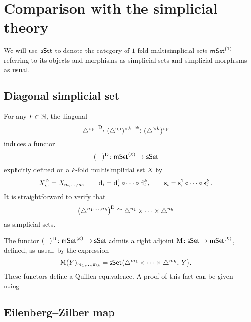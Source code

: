 
\section{Comparison with the simplicial theory}\label{s:comparison}

We will use $\mathsf{sSet}$ to denote the category of $1$-fold multisimplicial sets $\mathsf{mSet}^{(1)}$ referring to its objects and morphisms as simplicial sets and simplicial morphisms as usual.

\subsection{Diagonal simplicial set}\label{ss:diagonal}

For any $k \in \mathbb{N}$, the diagonal
\[
\triangle^{\mathrm{op}} \xrightarrow{\mathrm{D}}
(\triangle^{\mathrm{op}})^{\times k} \xrightarrow{\cong}
(\triangle^{\times k})^{\mathrm{op}}
\]
induces a functor
\[
(-)^{\mathrm{D}} \colon \mathsf{mSet}^{(k)} \to \mathsf{sSet}
\]
explicitly defined on a $k$-fold multisimplicial set $X$ by
\begin{gather*}
	X^{\mathrm{D}}_m = X_{m, \dots, m},
	\qquad
	\operatorname{d}_i = \operatorname{d}_i^1 \circ \dots \circ \operatorname{d}_i^k,
	\qquad
	\operatorname{s}_i = \operatorname{s}_i^1 \circ \dots \circ \operatorname{s}_i^k.
\end{gather*}
It is straightforward to verify that
\[
\big(\triangle^{n_1,\dots,n_k}\big)^{\mathrm{D}} \cong
\triangle^{n_1}\times\dots\times\triangle^{n_k}
\]
as simplicial sets.

The functor $(-)^{\mathrm{D}} \colon \mathsf{mSet}^{(k)} \to \mathsf{sSet}$ admits a right adjoint $\operatorname{M} \colon \mathsf{sSet} \to \mathsf{mSet}^{(k)}$, defined, as usual, by the expression
\[
\operatorname{M}(Y)_{m_1,\dots,m_k} =
\mathsf{sSet}\big( \triangle^{m_1} \times \dots \times \triangle^{m_k}, \, Y \big).
\]
These functors define a Quillen equivalence.
A proof of this fact can be given using \cite[Proposition~1.6.8]{maltsiniotis2005grothendieck}.

\subsection{Eilenberg--Zilber map}\label{ss:eilenber-zilber}

